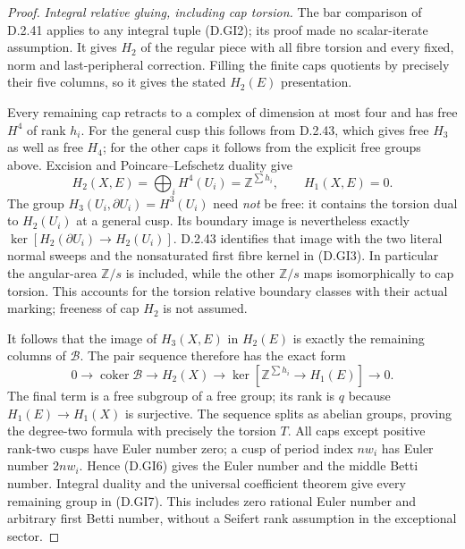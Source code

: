 \begin{proof}
\emph{Integral relative gluing, including cap torsion.}
The bar comparison of D.2.41 applies to any integral
tuple (D.GI2); its proof made no scalar-iterate
assumption. It gives $H_2$ of the regular piece
with all fibre torsion and every fixed, norm and
last-peripheral correction. Filling the finite
caps quotients by precisely their five columns,
so it gives the stated $H_2(E)$ presentation.

Every remaining cap retracts to a complex of
dimension at most four and has free $H^4$ of
rank $h_i$. For the general cusp this follows
from D.2.43, which gives free $H_3$ as well as
free $H_4$; for the other caps it follows from
the explicit free groups above. Excision and
Poincare--Lefschetz duality give
\[
 H_2(X,E)=\bigoplus_iH^4(U_i)=\mathbb Z^{\sum h_i},
                    \qquad H_1(X,E)=0 .                  \tag{D.GI10}
\]
The group $H_3(U_i,\partial U_i)=H^3(U_i)$ need
\emph{not} be free: it contains the torsion dual
to $H_2(U_i)$ at a general cusp. Its boundary
image is nevertheless exactly
$\ker[H_2(\partial U_i)\to H_2(U_i)]$.
D.2.43 identifies that image with the two literal
normal sweeps and the nonsaturated first fibre
kernel in (D.GI3). In particular the angular-area
$\mathbb Z/s$ is included, while the other
$\mathbb Z/s$ maps isomorphically to cap torsion.
This accounts for the torsion relative boundary
classes with their actual marking; freeness of
cap $H_2$ is not assumed.

It follows that the image of $H_3(X,E)$ in
$H_2(E)$ is exactly the remaining columns of
$\mathcal B$. The pair sequence therefore has
the exact form
\[
 0\longrightarrow\operatorname{coker}\mathcal B
 \longrightarrow H_2(X)
 \longrightarrow\ker[\mathbb Z^{\sum h_i}\to H_1(E)]
 \longrightarrow0.                                      \tag{D.GI11}
\]
The final term is a free subgroup of a free
group; its rank is $q$ because
$H_1(E)\to H_1(X)$ is surjective. The sequence
splits as abelian groups, proving the degree-two
formula with precisely the torsion $T$.
All caps except positive rank-two cusps have
Euler number zero; a cusp of period index $nw_i$
has Euler number $2nw_i$. Hence (D.GI6) gives
the Euler number and the middle Betti number.
Integral duality and the universal coefficient
theorem give every remaining group in (D.GI7).
This includes zero rational Euler number and
arbitrary first Betti number, without a Seifert
rank assumption in the exceptional sector.
\end{proof}

